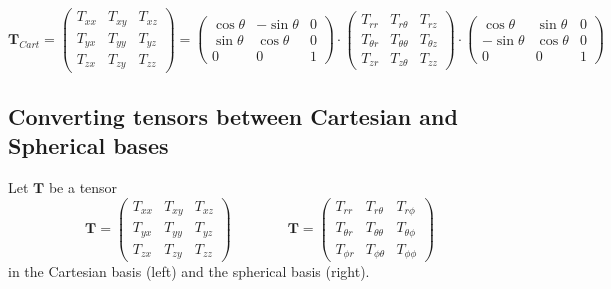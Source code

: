 \[
{\bm T}_{Cart}=
\left(\begin{array}{ccc}
T_{xx} & T_{xy} & T_{xz} \\
T_{yx} & T_{yy} & T_{yz} \\
T_{zx} & T_{zy} & T_{zz} 
\end{array}\right)
=
\left(\begin{array}{ccc}
 \cos \theta&-\sin \theta&0 \\
\sin \theta&\cos \theta&0 \\
0 & 0 & 1 
\end{array}\right)
\cdot
\left(\begin{array}{ccc}
T_{rr}       & T_{r\theta}      & T_{rz} \\
T_{\theta r} & T_{\theta\theta} & T_{\theta z} \\
T_{z r}      & T_{z \theta}     & T_{zz}
\end{array}\right)
\cdot
\left(\begin{array}{ccc}
\cos \theta & \sin \theta&0 \\
-\sin \theta &  \cos \theta&0 \\
0 & 0 & 1 
\end{array}\right)
\]



\subsection{Converting tensors between Cartesian and Spherical bases \label{ss:convcartspher}}

Let ${\bm T}$ be a tensor
\[
{\bm T}=
\left(
\begin{array}{ccc}
T_{xx} & T_{xy} & T_{xz} \\
T_{yx} & T_{yy} & T_{yz} \\
T_{zx} & T_{zy} & T_{zz} 
\end{array}
\right)
\qquad\qquad
{\bm T}=
\left(
\begin{array}{ccc}
T_{rr}       & T_{r\theta}      & T_{r\phi} \\
T_{\theta r} & T_{\theta\theta} & T_{\theta\phi} \\
T_{\phi r}   & T_{\phi \theta}  & T_{\phi\phi}
\end{array}
\right)
\]
in the Cartesian basis (left) and the spherical basis (right).

